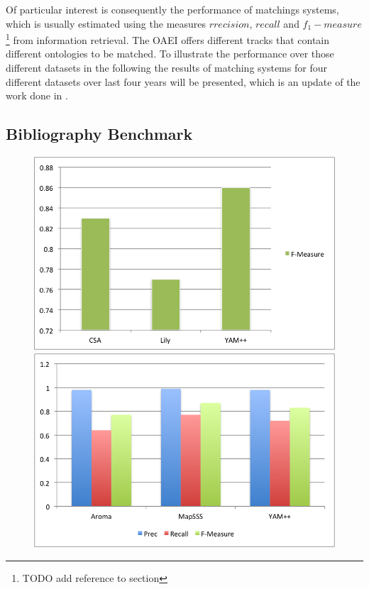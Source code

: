 \documentclass[11pt,titlepage,oneside,openany,a4paper]{report}
\begin{document}
Of particular interest is consequently the performance of matchings systems, which is usually estimated using the measures $rrecision$, $recall$ and $f_1-measure$ \footnote{TODO add reference to section} from information retrieval. The OAEI offers different tracks that contain different ontologies to be matched. To illustrate the performance over those different datasets in the following the results of matching systems for four different datasets over last four years will be presented, which is an update of the work done in \cite{6104044}.

\subsection{Bibliography Benchmark}
\begin{figure}
 \includegraphics[scale=.5]{figures/oaei/benchmark/top2011.png} 
 \includegraphics[scale=.5]{figures/oaei/benchmark/top2012.png}

\end{figure}
\end{document}
